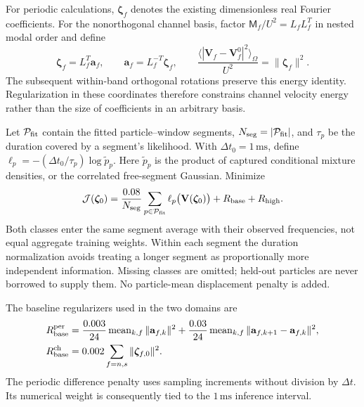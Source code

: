 \documentclass[11pt]{article}
\numberwithin{equation}{section}
\begin{document}
For periodic calculations, $\bm\zeta_f$ denotes the existing dimensionless real Fourier coefficients. For the nonorthogonal channel basis, factor $\mathsf M_f/U^2=L_fL_f^T$ in nested modal order and define
\begin{equation}
 \bm\zeta_f=L_f^T\mathbf a_f,\qquad
 \mathbf a_f=L_f^{-T}\bm\zeta_f,\qquad
 \frac{\langle|\mathbf V_f-\mathbf V_f^0|^2\rangle_\Omega}{U^2}
 =\|\bm\zeta_f\|^2.
 \label{eq:energycoordinates}
\end{equation}
The subsequent within-band orthogonal rotations preserve this energy identity. Regularization in these coordinates therefore constrains channel velocity energy rather than the size of coefficients in an arbitrary basis.

Let $\mathcal P_{\rm fit}$ contain the fitted particle--window segments, $N_{\rm seg}=|\mathcal P_{\rm fit}|$, and $\tau_p$ be the duration covered by a segment's likelihood. With $\Delta t_0=1\,\mathrm{ms}$, define $\ell_p=-(\Delta t_0/\tau_p)\log\widetilde p_p$. Here $\widetilde p_p$ is the product of captured conditional mixture densities, or the correlated free-segment Gaussian. Minimize
\begin{equation}
 \mathcal J(\bm\zeta_0)=
 \frac{0.08}{N_{\rm seg}}\sum_{p\in\mathcal P_{\rm fit}}
 \ell_p\bigl(\mathbf V(\bm\zeta_0)\bigr)
 +R_{\rm base}+R_{\rm high}.
 \label{eq:inverseobjective}
\end{equation}
Both classes enter the same segment average with their observed frequencies, not equal aggregate training weights. Within each segment the duration normalization avoids treating a longer segment as proportionally more independent information. Missing classes are omitted; held-out particles are never borrowed to supply them. No particle-mean displacement penalty is added.

The baseline regularizers used in the two domains are
\begin{equation}
 \begin{aligned}
 R_{\rm base}^{\rm per}
 &=\frac{0.003}{24}\operatorname{mean}_{k,f}\|\mathbf a_{f,k}\|^2
   +\frac{0.03}{24}\operatorname{mean}_{k,f}
        \|\mathbf a_{f,k+1}-\mathbf a_{f,k}\|^2,\\
 R_{\rm base}^{\rm ch}
 &=0.002\sum_{f=n,s}\|\bm\zeta_{f,0}\|^2.
 \end{aligned}
 \label{eq:baseregularization}
\end{equation}
The periodic difference penalty uses sampling increments without division by $\Delta t$. Its numerical weight is consequently tied to the $1\,\mathrm{ms}$ inference interval.
\end{document}

